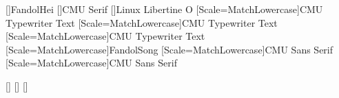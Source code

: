 \usepackage[russian,croatian,chinese,provide*=*]{babel}
[]{FandolHei}
[]{CMU Serif}
[]{Linux Libertine O}
[Scale=MatchLowercase]{CMU Typewriter Text}
[Scale=MatchLowercase]{CMU Typewriter Text}
[Scale=MatchLowercase]{CMU Typewriter Text}
[Scale=MatchLowercase]{FandolSong}
[Scale=MatchLowercase]{CMU Sans Serif}
[Scale=MatchLowercase]{CMU Sans Serif}
\usepackage{xeCJK}
[]
[]
[]
